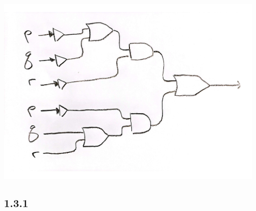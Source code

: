 \documentclass[12pt,titlepage]{extarticle}
\begin{document}
\begin{center}
\includegraphics[scale=0.25]{circuit.pdf}
\end{center}

\subsection*{1.3.1}
\end{document}
